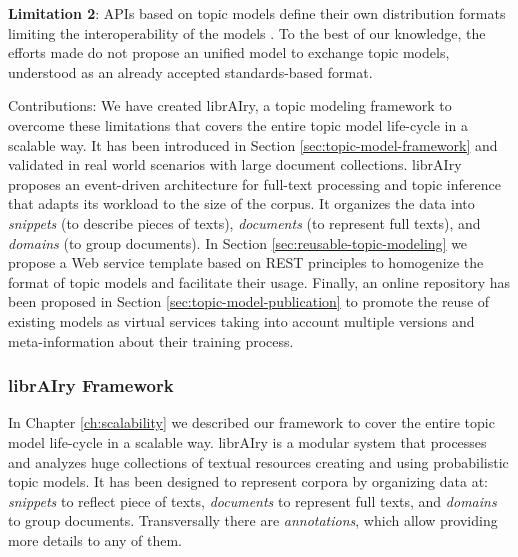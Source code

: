 \textbf{Limitation 2}: APIs based on topic models define their own distribution formats limiting the interoperability of the models \citep{Lisena:NLPOSS2020}. To the best of our knowledge, the efforts made do not propose an unified model to exchange topic models, understood as an already accepted standards-based format.

Contributions: We have created librAIry, a topic modeling framework to overcome these limitations that covers the entire topic model life-cycle in a scalable way. It has been introduced in Section \ref{sec:topic-model-framework} and validated in real world scenarios with large document collections. librAIry proposes an event-driven architecture for full-text processing and topic inference that adapts its workload to the size of the corpus. It organizes the data into \textit{snippets} (to describe pieces of texts), \textit{documents } (to represent full texts), and \textit{domains} (to group documents). In Section \ref{sec:reusable-topic-modeling} we propose a Web service template based on REST principles to homogenize the format of  topic models and facilitate their usage. Finally, an online repository has been proposed in Section \ref{sec:topic-model-publication} to promote the reuse of existing models as virtual services taking into account multiple versions and meta-information about their training process.
























\subsubsection{librAIry Framework}

In Chapter \ref{ch:scalability} we described our framework to cover the entire topic model life-cycle in a scalable way. librAIry is a modular system that processes and analyzes huge collections of textual resources creating and using probabilistic topic models. It has been designed to represent corpora by organizing data at: \textit{snippets} to reflect piece of texts, \textit{documents} to represent full texts, and \textit{domains} to group documents. Transversally there are \textit{annotations}, which allow providing more details to any of them.

